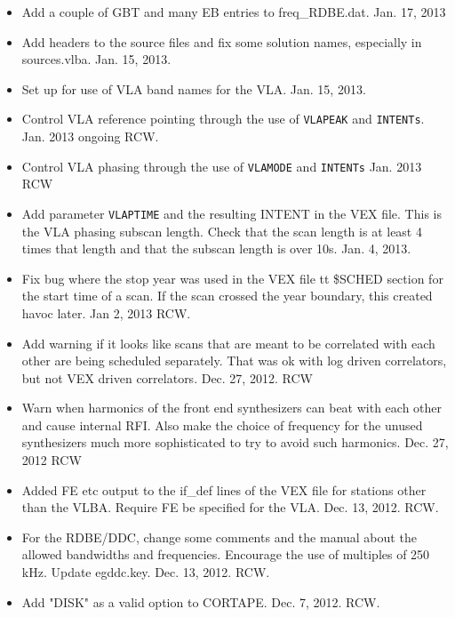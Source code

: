 \documentclass{report}
\begin{document}
\begin{itemize}
\item Add a couple of GBT and many EB entries to freq\_RDBE.dat.  Jan. 17, 2013

\item Add headers to the source files and fix some solution names, 
especially in sources.vlba.  Jan. 15, 2013.

\item Set up for use of VLA band names for the VLA.  Jan. 15, 2013.

\item Control VLA reference pointing through the use of {\tt VLAPEAK} and 
{\tt INTENTs}.  Jan. 2013 ongoing  RCW.

\item Control VLA phasing through the use of {\tt VLAMODE} and {\tt INTENTs}
Jan. 2013  RCW

\item Add parameter {\tt VLAPTIME} and the resulting INTENT in the VEX file.
This is the VLA phasing subscan length.  Check that the scan length is
at least 4 times that length and that the subscan length is over 10s. 
Jan. 4, 2013.

\item Fix bug where the stop year was used in the VEX file {tt
\$SCHED} section for the start time of a scan.  If the scan crossed
the year boundary, this created havoc later.  Jan 2, 2013 RCW.

\item Add warning if it looks like scans that are meant to be correlated
with each other are being scheduled separately.  That was ok with log
driven correlators, but not VEX driven correlators.  Dec. 27, 2012. RCW

\item Warn when harmonics of the front end synthesizers can beat with
each other and cause internal RFI.  Also make the choice of frequency
for the unused synthesizers much more sophisticated to try to avoid
such harmonics.  Dec. 27, 2012  RCW

\item Added FE etc output to the if\_def lines of the VEX file for
stations other than the VLBA.  Require FE be specified for the VLA.
Dec. 13, 2012.  RCW.

\item For the RDBE/DDC, change some comments and the manual about the
allowed bandwidths and frequencies.  Encourage the use of multiples
of 250 kHz.  Update egddc.key.  Dec. 13, 2012.  RCW.

\item Add "DISK" as a valid option to CORTAPE.  Dec. 7, 2012.  RCW.


\end{itemize}
\end{document}
